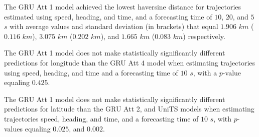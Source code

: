 \begin{table}[!ht]
	\centering
	\caption{The average haversine distance in $km$, with standard deviation in brackets, across k-fold validation datasets for the trajectories in the k-fold testing datasets estimated using speed, heading, and time, different RNN models, and forecasting times.}
	\label{tab:best_speed_actual_dir_haversine}
\end{table}

The GRU Att 1 model achieved the lowest haversine distance for trajectories estimated using speed, heading, and time, and a forecasting time of $10$, $20$, and $5$ $s$ with average values and standard deviation (in brackets) that equal $1.906$ $km$ ($0.116$ $km$), $3.075$ $km$ ($0.202$ $km$), and $1.665$ $km$ ($0.083$ $km$) respectively.

The GRU Att 1 model does not make statistically significantly different predictions for longitude than the GRU Att 4 model when estimating trajectories using speed, heading, and time and a forecasting time of $10$ $s$, with a $p$-value equaling $0.425$.

The GRU Att 1 model does not make statistically significantly different predictions for latitude than the GRU Att 2, and UniTS models when estimating trajectories speed, heading, and time, and a forecasting time of $10$ $s$, with $p$-values equaling $0.025$, and $0.002$.

